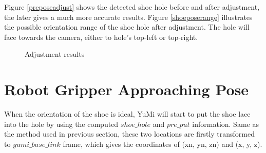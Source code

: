 Figure \ref{preposeadjust} shows the detected shoe hole before and after adjustment, the later gives a much more accurate results. Figure \ref{shoeposerange} illustrates the possible orientation range of the shoe hole after adjustment. The hole will face towards the camera, either to hole's top-left or top-right.

\begin{figure}[H]
\centering
{}
\caption{Adjustment results}
\end{figure}


\section{Robot Gripper Approaching Pose} \label{approachposegripper}
When the orientation of the shoe is ideal, YuMi will start to put the shoe lace into the hole by using the computed $shoe\_hole$ and $pre\_put$ information. Same as the method used in previous section, these two locations are firstly transformed to $yumi\_base\_link$ frame, which gives the coordinates of (xn, yn, zn) and (x, y, z).

